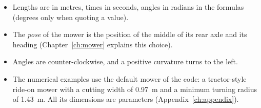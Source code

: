 \begin{itemize}
  \item Lengths are in metres, times in seconds, angles in radians in the
    formulas (degrees only when quoting a value).
  \item The \emph{pose} of the mower is the position of the middle of its rear
    axle and its heading (Chapter~\ref{ch:mower} explains this choice).
  \item Angles are counter-clockwise, and a positive curvature turns to the
    left.
  \item The numerical examples use the default mower of the code: a
    tractor-style ride-on mower with a cutting width of
    \SI{0.97}{\metre} and a minimum turning radius of \SI{1.43}{\metre}. All
    its dimensions are parameters (Appendix~\ref{ch:appendix}).
\end{itemize}
